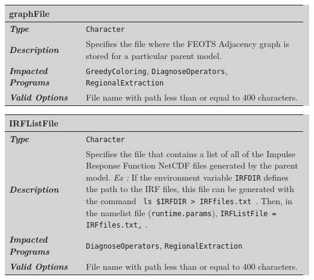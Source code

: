 \documentclass{softwaremanual}
\begin{document}

\noindent\begingroup\setlength{\fboxsep}{0pt}
\colorbox{lightgray}{
\begin{tabular}{p{0.25\linewidth} p{0.725\linewidth}}
\toprule
\textbf{graphFile} & \\
\midrule
\textbf{\textit{Type}} & \texttt{Character} \\
\midrule
\textbf{\textit{Description}} & Specifies the file where the FEOTS Adjacency graph is stored for a particular parent model.  \\
\midrule
\textbf{\textit{Impacted Programs}} & \texttt{GreedyColoring}, \texttt{DiagnoseOperators}, \texttt{RegionalExtraction} \\
\midrule
\textbf{\textit{Valid Options}}  & File name with path less than or equal to 400 characters. \\
\bottomrule
\end{tabular}
}\endgroup

\noindent\begingroup\setlength{\fboxsep}{0pt}
\colorbox{lightgray}{
\begin{tabular}{p{0.25\linewidth} p{0.725\linewidth}}
\toprule
\textbf{IRFListFile} & \\
\midrule
\textbf{\textit{Type}} & \texttt{Character} \\
\midrule
\textbf{\textit{Description}} & Specifies the file that contains a list of all of the Impulse Response Function NetCDF files generated by the parent model. \textit{Ex :} If the environment variable \texttt{IRFDIR} defines the path to the IRF files, this file can be generated with the command \texttt{ ls \$IRFDIR > IRFfiles.txt }. Then, in the namelist file (\texttt{runtime.params}), \texttt{IRFListFile = IRFfiles.txt,} . \\
\midrule
\textbf{\textit{Impacted Programs}} & \texttt{DiagnoseOperators}, \texttt{RegionalExtraction} \\
\midrule
\textbf{\textit{Valid Options}}  & File name with path less than or equal to 400 characters. \\
\bottomrule
\end{tabular}
}\endgroup
\end{document}
